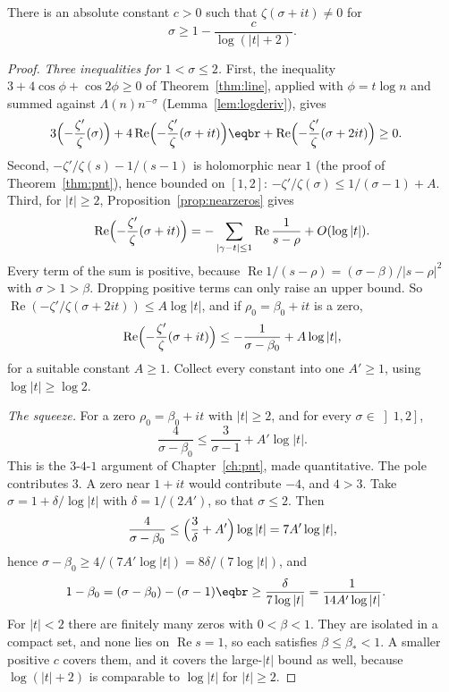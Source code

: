 \begin{theorem}\label{thm:zerofree}
There is an absolute constant $c>0$ such that $\zeta(\sigma+it)\ne0$ for
\[
\sigma\ge1-\frac c{\log(|t|+2)}.
\]
\end{theorem}
\begin{proof}
\emph{Three inequalities for $1<\sigma\le2$.} First, the inequality $3+4\cos\phi+\cos2\phi\ge0$ of Theorem~\ref{thm:line}, applied with $\phi=t\log n$ and summed against $\Lambda(n)n^{-\sigma}$ (Lemma~\ref{lem:logderiv}), gives
\[
\begin{aligned}3\Bigl(-\frac{\zeta'}{\zeta}(\sigma)\Bigr)&+4\operatorname{Re}\Bigl(-\frac{\zeta'}{\zeta}(\sigma+it)\Bigr)\eqbr+\operatorname{Re}\Bigl(-\frac{\zeta'}{\zeta}(\sigma+2it)\Bigr)\ge0.\end{aligned}
\]
Second, $-\zeta'/\zeta(s)-1/(s-1)$ is holomorphic near $1$ (the proof of Theorem~\ref{thm:pnt}), hence bounded on $[1,2]$: $-\zeta'/\zeta(\sigma)\le1/(\sigma-1)+A$. Third, for $|t|\ge2$, Proposition~\ref{prop:nearzeros} gives
\[
\operatorname{Re}\Bigl(-\frac{\zeta'}{\zeta}(\sigma+it)\Bigr)=-\sum_{|\gamma-t|\le1}\operatorname{Re}\frac1{s-\rho}+O(\log|t|).
\]
Every term of the sum is positive, because $\operatorname{Re}1/(s-\rho)=(\sigma-\beta)/|s-\rho|^2$ with $\sigma>1>\beta$. Dropping positive terms can only raise an upper bound. So $\operatorname{Re}(-\zeta'/\zeta(\sigma+2it))\le A\log|t|$, and if $\rho_0=\beta_0+it$ is a zero,
\[
\operatorname{Re}\Bigl(-\frac{\zeta'}{\zeta}(\sigma+it)\Bigr)\le-\frac1{\sigma-\beta_0}+A\log|t|,
\]
for a suitable constant $A\ge1$. Collect every constant into one $A'\ge1$, using $\log|t|\ge\log2$.

\emph{The squeeze.} For a zero $\rho_0=\beta_0+it$ with $|t|\ge2$, and for every $\sigma\in\left]1,2\right]$,
\[
\frac4{\sigma-\beta_0}\le\frac3{\sigma-1}+A'\log|t|.
\]
This is the $3$-$4$-$1$ argument of Chapter~\ref{ch:pnt}, made quantitative. The pole contributes $3$. A zero near $1+it$ would contribute $-4$, and $4>3$. Take $\sigma=1+\delta/\log|t|$ with $\delta=1/(2A')$, so that $\sigma\le2$. Then
\[
\frac4{\sigma-\beta_0}\le\Bigl(\frac3\delta+A'\Bigr)\log|t|=7A'\log|t|,
\]
hence $\sigma-\beta_0\ge4/(7A'\log|t|)=8\delta/(7\log|t|)$, and
\[
\begin{aligned}1-\beta_0&=(\sigma-\beta_0)-(\sigma-1)\eqbr\ge\frac{\delta}{7\log|t|}=\frac1{14A'\log|t|}.\end{aligned}
\]
For $|t|<2$ there are finitely many zeros with $0<\beta<1$. They are isolated in a compact set, and none lies on $\operatorname{Re}s=1$, so each satisfies $\beta\le\beta_*<1$. A smaller positive $c$ covers them, and it covers the large-$|t|$ bound as well, because $\log(|t|+2)$ is comparable to $\log|t|$ for $|t|\ge2$.
\end{proof}

